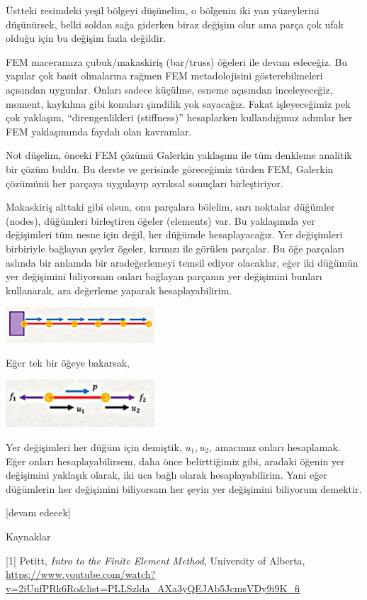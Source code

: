 \documentclass[12pt,fleqn]{article}\usepackage{../../common}
\begin{document}
Üstteki resimdeki yeşil bölgeyi düşünelim, o bölgenin iki yan yüzeylerini
düşünürsek, belki soldan sağa giderken biraz değişim olur ama parça çok ufak
olduğu için bu değişim fazla değildir. 

FEM maceramıza çubuk/makaskiriş (bar/truss) öğeleri ile devam edeceğiz.  Bu
yapılar çok basit olmalarına rağmen FEM metadolojisini gösterebilmeleri
açısından uygunlar. Onları sadece küçülme, esneme açısından inceleyeceğiz,
moment, kaykılma gibi konuları şimdilik yok sayacağız. Fakat işleyeceğimiz pek
çok yaklaşım, ``direngenlikleri (stiffness)'' hesaplarken kullandığımız adımlar
her FEM yaklaşımında faydalı olan kavramlar.

Not düşelim, önceki FEM çözümü Galerkin yaklaşımı ile tüm denkleme analitik bir
çözüm buldu. Bu derste ve gerisinde göreceğimiz türden FEM, Galerkin çözümünü
her parçaya uygulayıp ayrıksal sonuçları birleştiriyor.

Makaskiriş alttaki gibi olsun, onu parçalara bölelim, sarı noktalar düğümler
(nodes), düğümleri birleştiren öğeler (elements) var. Bu yaklaşımda yer
değişimleri tüm nesne için değil, her düğümde hesaplayacağız. Yer değişimleri
birbiriyle bağlayan şeyler ögeler, kırmızı ile görülen parçalar.  Bu öğe
parçaları aslında bir anlamda bir aradeğerlemeyi temsil ediyor olacaklar, eğer
iki düğümün yer değişimini biliyorsam onları bağlayan parçanın yer değişimini
bunları kullanarak, ara değerleme yaparak hesaplayabilirim.

\includegraphics[width=15em]{compscieng_bpp45fem2_03.jpg}

Eğer tek bir öğeye bakarsak,

\includegraphics[width=15em]{compscieng_bpp45fem2_04.jpg}

Yer değişimleri her düğüm için demiştik, $u_1,u_2$, amacımız onları hesaplamak.
Eğer onları hesaplayabilirsem, daha önce belirttiğimiz gibi, aradaki öğenin
yer değişimini yaklaşık olarak, iki uca bağlı olarak hesaplayabilirim.  Yani
eğer düğümlerin her değişimini biliyorsam her şeyin yer değişimini biliyorum
demektir.












[devam edecek]

Kaynaklar

[1] Petitt, {\em Intro to the Finite Element Method}, University of Alberta,
    \url{https://www.youtube.com/watch?v=2iUnfPRk6Ro&list=PLLSzlda_AXa3yQEJAb5JcmsVDy9i9K_fi}
\end{document}
